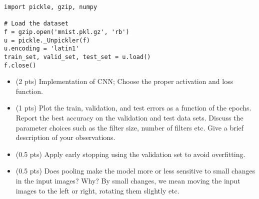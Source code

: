 \documentclass{exam}
\begin{document}
\begin{questions}
 \begin{lstlisting}
import pickle, gzip, numpy

# Load the dataset
f = gzip.open('mnist.pkl.gz', 'rb')
u = pickle._Unpickler(f)
u.encoding = 'latin1'
train_set, valid_set, test_set = u.load()
f.close()
\end{lstlisting}


\begin{itemize}
\item (2 pts) Implementation of CNN; Choose the proper activation and loss function.
\item (1 pts) Plot the train, validation, and test errors as a function of the epochs. Report the best accuracy on the validation and test data sets. Discuss the parameter choices such as the filter size, number of filters etc. Give a brief description of your observations.
\item (0.5 pts) Apply early stopping using the validation set to avoid overfitting.
\item (0.5 pts) Does pooling make the model more or less sensitive to small changes in the input images? Why? By small changes, we mean moving the input images to the left or right, rotating them slightly etc.
\end{itemize}

\end{questions}
\end{document}
